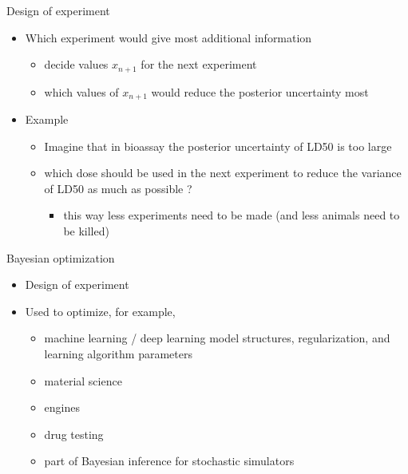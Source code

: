 \documentclass[t]{beamer}
\begin{document}
\begin{frame}
  
  {\Large\color{navyblue} Design of experiment}

  \begin{itemize}
  \item Which experiment would give most additional information
    \begin{itemize}
    \item decide values $x_{n+1}$ for the next experiment
    \item which values of $x_{n+1}$ would reduce the posterior
      uncertainty most
    \end{itemize}
  \item Example
    \begin{itemize}
    \item Imagine that in bioassay the posterior uncertainty of LD50 is too large
    \item which dose should be used in the next experiment to reduce
      the variance of LD50 as much as possible ?
      \begin{itemize}
        \item this way less experiments need to be made (and less animals need to be killed)
      \end{itemize}
    \end{itemize}
  \end{itemize}
\end{frame}

\begin{frame}
  
  {\Large\color{navyblue} Bayesian optimization}

  \begin{itemize}
  \item Design of experiment
  \item Used to optimize, for example,
    \begin{itemize}
    \item machine learning / deep learning model structures,
      regularization, and learning algorithm parameters
    \item material science
    \item engines
    \item drug testing
    \item part of Bayesian inference for stochastic simulators
    \end{itemize}
  \end{itemize}

\end{frame}
\end{document}
